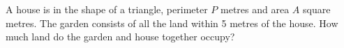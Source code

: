 A house is in the shape of a triangle, perimeter $P$ metres and area $A$ square metres.  The garden consists of all the land within 5 metres of the house.  How much land do the garden and house together occupy?